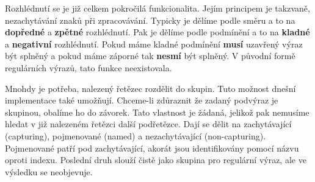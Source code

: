 Rozhlédnutí se je již celkem pokročilá funkcionalita. 
Jejím principem je takzvaně, nezachytávání znaků při zpracovávání.
Typicky je dělíme podle směru a to na \textbf{dopředné} a \textbf{zpětné} rozhlédnutí.
Pak je dělíme podle podmínění a to na \textbf{kladné} a \textbf{negativní} rozhlédnutí.
Pokud máme kladné podmínění \textbf{musí} uzavřený výraz být splněný a pokud máme záporné tak \textbf{nesmí} být splněný.
V původní formě regulárních výrazů, tato funkce neexistovala.

Mnohdy je potřeba, nalezený řetězec rozdělit do skupin. 
Tuto možnost dnešní implementace také umožňují.
Chceme-li zdůraznit že zadaný podvýraz je skupinou, obalíme ho do závorek.
Tato vlastnost je žádaná, jelikož pak nemusíme hledat v již nalezeném řetězci další podřetězce.
Dají se dělit na zachytávající (capturing), pojmenované (named) a nezachytávající (non-capturing).
Pojmenované patří pod zachytávající, akorát jsou identifikovány pomocí názvu oproti indexu.
Poslední druh slouží čistě jako skupina pro regulární výraz, ale ve výsledku se neobjevuje.

\endinput

